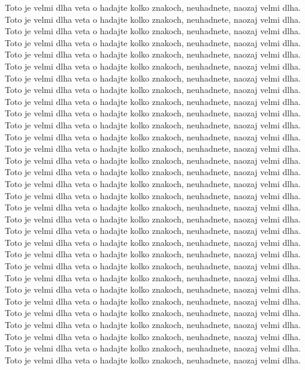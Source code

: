 Toto je velmi dlha veta o hadajte kolko znakoch, neuhadnete, naozaj velmi dlha.
Toto je velmi dlha veta o hadajte kolko znakoch, neuhadnete, naozaj velmi dlha.
Toto je velmi dlha veta o hadajte kolko znakoch, neuhadnete, naozaj velmi dlha.
Toto je velmi dlha veta o hadajte kolko znakoch, neuhadnete, naozaj velmi dlha.
Toto je velmi dlha veta o hadajte kolko znakoch, neuhadnete, naozaj velmi dlha.
Toto je velmi dlha veta o hadajte kolko znakoch, neuhadnete, naozaj velmi dlha.
Toto je velmi dlha veta o hadajte kolko znakoch, neuhadnete, naozaj velmi dlha.
Toto je velmi dlha veta o hadajte kolko znakoch, neuhadnete, naozaj velmi dlha.
Toto je velmi dlha veta o hadajte kolko znakoch, neuhadnete, naozaj velmi dlha.
Toto je velmi dlha veta o hadajte kolko znakoch, neuhadnete, naozaj velmi dlha.
Toto je velmi dlha veta o hadajte kolko znakoch, neuhadnete, naozaj velmi dlha.
Toto je velmi dlha veta o hadajte kolko znakoch, neuhadnete, naozaj velmi dlha.
Toto je velmi dlha veta o hadajte kolko znakoch, neuhadnete, naozaj velmi dlha.
Toto je velmi dlha veta o hadajte kolko znakoch, neuhadnete, naozaj velmi dlha.
Toto je velmi dlha veta o hadajte kolko znakoch, neuhadnete, naozaj velmi dlha.
Toto je velmi dlha veta o hadajte kolko znakoch, neuhadnete, naozaj velmi dlha.
Toto je velmi dlha veta o hadajte kolko znakoch, neuhadnete, naozaj velmi dlha.
Toto je velmi dlha veta o hadajte kolko znakoch, neuhadnete, naozaj velmi dlha.
Toto je velmi dlha veta o hadajte kolko znakoch, neuhadnete, naozaj velmi dlha.
Toto je velmi dlha veta o hadajte kolko znakoch, neuhadnete, naozaj velmi dlha.
Toto je velmi dlha veta o hadajte kolko znakoch, neuhadnete, naozaj velmi dlha.
Toto je velmi dlha veta o hadajte kolko znakoch, neuhadnete, naozaj velmi dlha.
Toto je velmi dlha veta o hadajte kolko znakoch, neuhadnete, naozaj velmi dlha.
Toto je velmi dlha veta o hadajte kolko znakoch, neuhadnete, naozaj velmi dlha.
Toto je velmi dlha veta o hadajte kolko znakoch, neuhadnete, naozaj velmi dlha.
Toto je velmi dlha veta o hadajte kolko znakoch, neuhadnete, naozaj velmi dlha.
Toto je velmi dlha veta o hadajte kolko znakoch, neuhadnete, naozaj velmi dlha.
Toto je velmi dlha veta o hadajte kolko znakoch, neuhadnete, naozaj velmi dlha.
Toto je velmi dlha veta o hadajte kolko znakoch, neuhadnete, naozaj velmi dlha.
Toto je velmi dlha veta o hadajte kolko znakoch, neuhadnete, naozaj velmi dlha.
Toto je velmi dlha veta o hadajte kolko znakoch, neuhadnete, naozaj velmi dlha.
